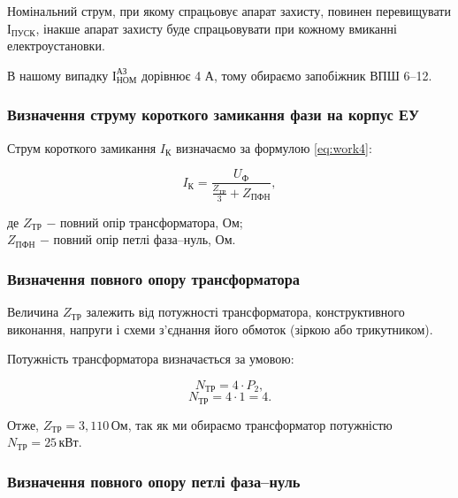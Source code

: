 Номінальний струм, при якому спрацьовує апарат захисту, повинен перевищувати $\text{І}_{\text{ПУСК}}$, інакше апарат захисту буде спрацьовувати при кожному вмиканні електроустановки.

В нашому випадку $\text{І}^{\text{АЗ}}_{\text{НОМ}}$ дорівнює 4 А, тому обираємо запобіжник ВПШ 6–12.

\subsubsection{Визначення струму короткого замикання фази на корпус ЕУ}

Струм короткого замикання $I_{\text{К}}$ визначаємо за формулою \ref{eq:work4}:

\begin{equation}\label{eq:work4}
	I_{\text{К}} = \frac{U_{\text{Ф}}}{\frac{Z_{\text{ТР}}}{3} + Z_{\text{ПФН}}},
\end{equation}

\noindent де $Z_{\text{ТР}}$ $-$ повний опір трансформатора, Ом; \\
\hspace*{15pt} $Z_{\text{ПФН}}$ $-$ повний опір петлі фаза–нуль, Ом.

\vspace{1.5em}

\subsubsection{Визначення повного опору трансформатора}

Величина $Z_{\text{ТР}}$ залежить від потужності трансформатора, конструктивного виконання, напруги і схеми з'єднання його обмоток (зіркою або трикутником).

Потужність трансформатора визначається за умовою:

\begin{equation}
	N_{\text{ТР}} = 4 \cdot P_{2},
\end{equation}
\[
	N_{\text{ТР}} = 4 \cdot 1 = 4.
\]

\vspace{1.5em}

Отже,  $Z_{\text{ТР}} = 3,110 \, \text{Ом}$,  так як  ми обираємо  трансформатор  потужністю $N_{\text{ТР}} = 25 \, \text{кВт}$.

\subsubsection{Визначення повного опору петлі фаза–нуль}

